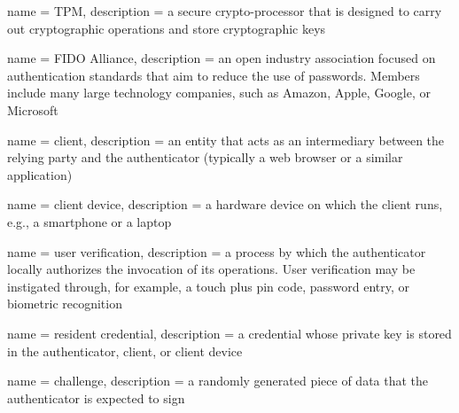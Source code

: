 {
	name = TPM,
	description = {a secure crypto-processor that is designed to carry out cryptographic operations and store cryptographic keys}
}

{
	name = FIDO Alliance,
	description = {an open industry association focused on authentication standards that aim to reduce the use of passwords. Members include many large technology companies, such as Amazon, Apple, Google, or Microsoft}
}

{
	name = client,
	description = {an entity that acts as an intermediary between the relying party and the authenticator (typically a web browser or a similar application)}
}

{
	name = client device,
	description = {a hardware device on which the client runs, e.g., a smartphone or a laptop}
}

{
	name = user verification,
	description = {a process by which the authenticator locally authorizes the invocation of its operations. User verification may be instigated through, for example, a touch plus pin code, password entry, or biometric recognition}
}

{
	name = resident credential,
	description = {a credential whose private key is stored in the authenticator, client, or client device}
}

{
	name = challenge,
	description = {a randomly generated piece of data that the authenticator is expected to sign}
}

